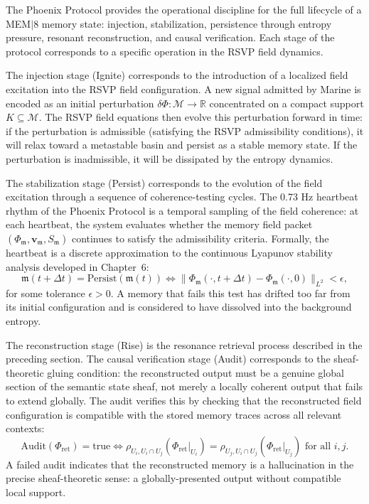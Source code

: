 \documentclass[12pt, a4paper, openany]{book}
\theoremstyle{plain}
\theoremstyle{definition}
\theoremstyle{remark}
\newcommand{\vvec}{\mathbf{v}}
\newcommand{\Sfield}{S}
\begin{document}
The Phoenix Protocol provides the operational discipline for the full lifecycle of a MEM$|$8 memory state: injection, stabilization, persistence through entropy pressure, resonant reconstruction, and causal verification. Each stage of the protocol corresponds to a specific operation in the RSVP field dynamics.

The injection stage (Ignite) corresponds to the introduction of a localized field excitation into the RSVP field configuration. A new signal admitted by Marine is encoded as an initial perturbation $\delta\Phi: \mathcal{M} \to \mathbb{R}$ concentrated on a compact support $K \subseteq \mathcal{M}$. The RSVP field equations then evolve this perturbation forward in time: if the perturbation is admissible (satisfying the RSVP admissibility conditions), it will relax toward a metastable basin and persist as a stable memory state. If the perturbation is inadmissible, it will be dissipated by the entropy dynamics.

The stabilization stage (Persist) corresponds to the evolution of the field excitation through a sequence of coherence-testing cycles. The 0.73 Hz heartbeat rhythm of the Phoenix Protocol is a temporal sampling of the field coherence: at each heartbeat, the system evaluates whether the memory field packet $(\Phi_\mathfrak{m}, \vvec_\mathfrak{m}, \Sfield_\mathfrak{m})$ continues to satisfy the admissibility criteria. Formally, the heartbeat is a discrete approximation to the continuous Lyapunov stability analysis developed in Chapter~6:
\[
\mathfrak{m}(t + \Delta t) = \mathrm{Persist}(\mathfrak{m}(t)) \iff \|\Phi_\mathfrak{m}(\cdot, t+\Delta t) - \Phi_\mathfrak{m}(\cdot, 0)\|_{L^2} < \epsilon,
\]
for some tolerance $\epsilon > 0$. A memory that fails this test has drifted too far from its initial configuration and is considered to have dissolved into the background entropy.

The reconstruction stage (Rise) is the resonance retrieval process described in the preceding section. The causal verification stage (Audit) corresponds to the sheaf-theoretic gluing condition: the reconstructed output must be a genuine global section of the semantic state sheaf, not merely a locally coherent output that fails to extend globally. The audit verifies this by checking that the reconstructed field configuration is compatible with the stored memory traces across all relevant contexts:
\[
\mathrm{Audit}(\Phi_{\mathrm{ret}}) = \mathrm{true} \iff \rho_{U_i, U_i \cap U_j}(\Phi_{\mathrm{ret}}|_{U_i}) = \rho_{U_j, U_i \cap U_j}(\Phi_{\mathrm{ret}}|_{U_j}) \text{ for all } i, j.
\]
A failed audit indicates that the reconstructed memory is a hallucination in the precise sheaf-theoretic sense: a globally-presented output without compatible local support.
\end{document}
